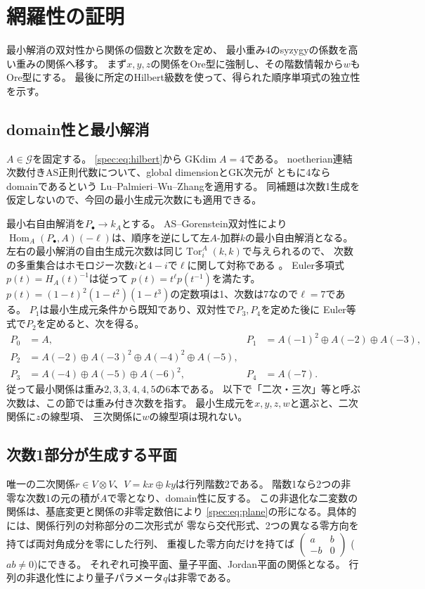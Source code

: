 \documentclass[11pt,a4paper]{ltjsarticle}
\theoremstyle{definition}
\newcommand{\Tor}{\operatorname{Tor}}
\newcommand{\Hom}{\operatorname{Hom}}
\newcommand{\GKdim}{\operatorname{GKdim}}
\newcommand{\Gclass}{\mathcal G}
\begin{document}
\section{網羅性の証明}\label{spec:sec:exhaustion}
最小解消の双対性から関係の個数と次数を定め、
最小重み4のsyzygyの係数を高い重みの関係へ移す。
まず$x,y,z$の関係をOre型に強制し、その階数情報から$w$もOre型にする。
最後に所定のHilbert級数を使って、得られた順序単項式の独立性を示す。

\subsection{domain性と最小解消}
$A\in\Gclass$を固定する。
\eqref{spec:eq:hilbert}から$\GKdim A=4$である。
noetherian連結次数付きAS正則代数について、global dimensionとGK次元が
ともに4ならdomainであるという
Lu--Palmieri--Wu--Zhang\cite[Lemma~1.3]{LPWZ}を適用する。
同補題は次数1生成を仮定しないので、今回の最小生成元次数にも適用できる。

最小右自由解消を$P_\bullet\to k_A$とする。
AS--Gorenstein双対性により
$\Hom_A(P_\bullet,A)(-\ell)$は、順序を逆にして左$A$-加群$k$の最小自由解消となる。
左右の最小解消の自由生成元次数は同じ$\Tor^A_i(k,k)$で与えられるので、
次数の多重集合はホモロジー次数$i$と$4-i$で$\ell$に関して対称である
\cite[Lemma~1.1]{LPWZ}。
Euler多項式$p(t)=H_A(t)^{-1}$は従って
$p(t)=t^\ell p(t^{-1})$を満たす。
$p(t)=(1-t)^2(1-t^2)(1-t^3)$の定数項は1、次数は7なので$\ell=7$である。
$P_1$は最小生成元条件から既知であり、双対性で$P_3,P_4$を定めた後に
Euler等式で$P_2$を定めると、次を得る。
\begin{equation}\label{spec:eq:resolution}
\begin{aligned}
P_0&=A,& P_1&=A(-1)^2\oplus A(-2)\oplus A(-3),\\
P_2&=A(-2)\oplus A(-3)^2\oplus A(-4)^2\oplus A(-5),\\
P_3&=A(-4)\oplus A(-5)\oplus A(-6)^2,& P_4&=A(-7).
\end{aligned}
\end{equation}
従って最小関係は重み$2,3,3,4,4,5$の6本である。
以下で「二次・三次」等と呼ぶ次数は、この節では重み付き次数を指す。
最小生成元を$x,y,z,w$と選ぶと、二次関係に$z$の線型項、
三次関係に$w$の線型項は現れない。

\subsection{次数1部分が生成する平面}
唯一の二次関係$r\in V\otimes V$、$V=kx\oplus ky$は行列階数2である。
階数1なら2つの非零な次数1の元の積が$A$で零となり、domain性に反する。
この非退化な二変数の関係は、基底変更と関係の非零定数倍により
\eqref{spec:eq:plane}の形になる。具体的には、関係行列の対称部分の二次形式が
零なら交代形式、2つの異なる零方向を持てば両対角成分を零にした行列、
重複した零方向だけを持てば
$\left(\begin{smallmatrix}a&b\\-b&0\end{smallmatrix}\right)$
($ab\ne0$)にできる。
それぞれ可換平面、量子平面、Jordan平面の関係となる。
行列の非退化性により量子パラメータ$q$は非零である。
\end{document}
